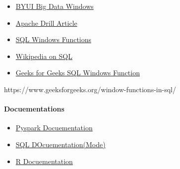\documentclass[
  letterpaper,
  DIV=11,
  numbers=noendperiod]{scrartcl}
\let\oldparagraph\paragraph
\renewcommand{\paragraph}[1]{\oldparagraph{#1}\mbox{}}
\providecommand{\tightlist}{%
  \setlength{\itemsep}{0pt}\setlength{\parskip}{0pt}}\usepackage{longtable,booktabs,array}
\begin{document}
\begin{itemize}
\tightlist
\item
  \href{\textquotesingle{}https://github.com/byuibigdata/spark_guide/blob/main/aggregate_calculations.md\textquotesingle{}}{BYUI
  Big Data Windows}
\item
  \href{\textquotesingle{}https://drill.apache.org/docs/sql-window-functions-introduction/\#:~:text=Window\%20functions\%20operate\%20on\%20a,to\%20calculate\%20the\%20returned\%20values.\textquotesingle{}}{Apache
  Drill Article}
\item
  \href{\textquotesingle{}https://towardsdatascience.com/a-guide-to-advanced-sql-window-functions-f63f2642cbf9\textquotesingle{}}{SQL
  Windows Functions}
\item
  \href{\textquotesingle{}https://en.wikipedia.org/wiki/Window_function_(SQL)\textquotesingle{}}{Wikipedia
  on SQL}
\item
  \href{\textquotesingle{}https://www.geeksforgeeks.org/window-functions-in-sql/\textquotesingle{}}{Geeks
  for Geeks SQL Windows Function}
\end{itemize}

https://www.geeksforgeeks.org/window-functions-in-sql/

\hypertarget{docuementations}{%
\paragraph{Docuementations}\label{docuementations}}

\begin{itemize}
\tightlist
\item
  \href{\textquotesingle{}https://sparkbyexamples.com/spark/spark-sql-window-functions/\textquotesingle{}}{Pyspark
  Docuementation}
\item
  \href{\textquotesingle{}https://mode.com/sql-tutorial/sql-window-functions/\textquotesingle{}}{SQL
  DOcuementation(Mode)}
\item
  \href{\textquotesingle{}https://cran.r-project.org/web/packages/dplyr/vignettes/window-functions.html\textquotesingle{}}{R
  Docuementation}
\end{itemize}
\end{document}
